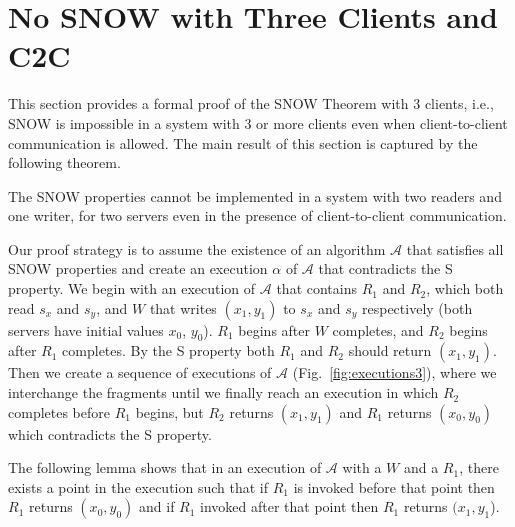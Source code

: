 \section{No SNOW with Three Clients and C2C}
\label{sec:formal_proof}
\sloppy This section provides a formal proof of the SNOW Theorem with 3 clients, i.e., SNOW is impossible in a system with 3 or more clients even when client-to-client communication is allowed. The main result of this section is captured by the following theorem. 
\begin{theorem}\label{thm:snow3}
	The SNOW properties cannot be implemented in a system with two readers and one writer, for two servers even in the presence of client-to-client communication.
\end{theorem}

Our proof strategy is to assume the existence of an algorithm $\mathcal{A}$ that satisfies all SNOW properties and create an execution $\alpha$ of $\mathcal{A}$ that contradicts the S property. 
We begin with an execution of $\mathcal{A}$ that contains \rots{} $R_1$ and $R_2$, which both read $s_x$ and $s_y$, and \wot{} $W$ that writes $(x_1, y_1)$ to $s_x$ and $s_y$ respectively (both servers have initial values $x_0$, $y_0$). $R_1$ begins after $W$ completes, and $R_2$ begins after $R_1$ completes. By the S property both  $R_1$   and $R_2$ should return $(x_1, y_1)$.
Then we create a sequence of 
executions of $\mathcal{A}$  (Fig.~\ref{fig:executions3}), where we interchange the fragments until we  finally reach
 an execution in which $R_2$ completes before $R_1$ begins, but $R_2$ returns 
$(x_1, y_1)$ and $R_1$ returns $(x_0, y_0)$ which contradicts the  S property.

The following lemma shows that in an execution of $\mathcal{A}$ with a \wot{} $W$ and a \rot{} $R_1$, there exists a point  in the execution
such that if $R_1$ is invoked before that point then $R_1$ returns $(x_0, y_0)$ and if $R_1$ invoked after 
that point then $R_1$ returns $(x_1, y_1$).

